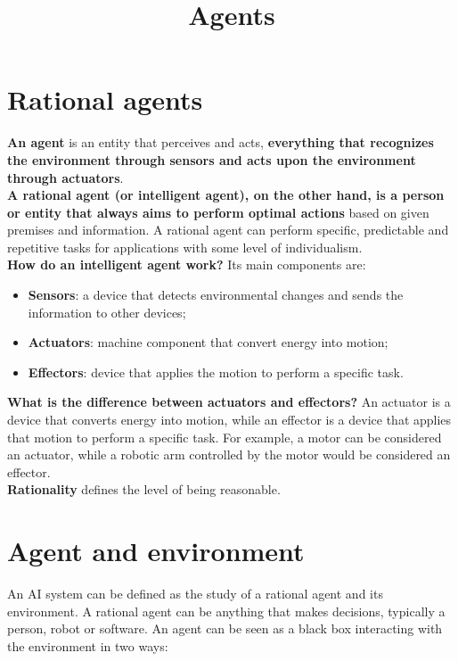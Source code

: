 \documentclass{article}
\title{Agents}
\author{}
\date{}
\begin{document}
\maketitle

\section{Rational agents}

\textbf{An agent} is an entity that perceives and acts, \textbf{everything that recognizes the environment through sensors and acts upon the environment through actuators}. \\


\textbf{A rational agent (or intelligent agent), on the other hand, is a person or entity that always aims to perform optimal actions} based on given premises and information. A rational agent can perform specific, predictable and repetitive tasks for applications with some level of individualism. \\


\textbf{How do an intelligent agent work?} Its main components are:
\begin{itemize}
\item \textbf{Sensors}: a device that detects environmental changes and sends the information to other devices;
\item \textbf{Actuators}: machine component that convert energy into motion;
\item \textbf{Effectors}: device that applies the motion to perform a specific task.
\end{itemize} 

\textbf{What is the difference between actuators and effectors?}
An actuator is a device that converts energy into motion, while an effector is a device that applies that motion to perform a specific task. For example, a motor can be considered an actuator, while a robotic arm controlled by the motor would be considered an effector. \\

\textbf{Rationality} defines the level of being reasonable.

\newpage

\section{Agent and environment}

An AI system can be defined as the study of a rational agent and its environment. 
A rational agent can be anything that makes decisions, typically a person, robot or software. An agent can be seen as a black box interacting with the environment in two ways:
\end{document}

